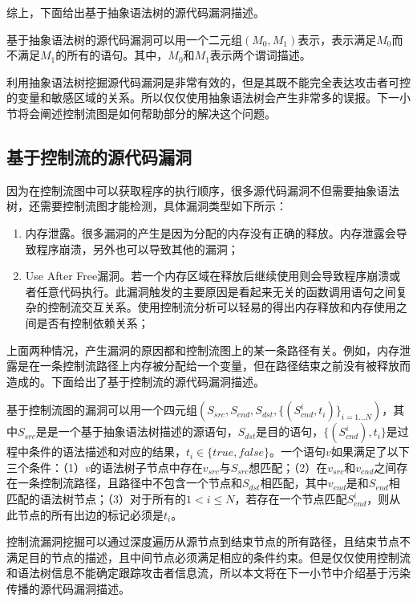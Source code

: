 综上，下面给出基于抽象语法树的源代码漏洞描述。

\begin{definition}
\label{基于抽象语法树的源代码漏洞描述}
基于抽象语法树的源代码漏洞可以用一个二元组$(M_0,M_1)$表示，表示满足$M_0$而不满足$M_1$的所有的语句。其中，$M_0$和$M_1$表示两个谓词描述。
\end{definition}

利用抽象语法树挖掘源代码漏洞是非常有效的，但是其既不能完全表达攻击者可控的变量和敏感区域的关系。所以仅仅使用抽象语法树会产生非常多的误报。下一小节将会阐述控制流图是如何帮助部分的解决这个问题。

\subsection{基于控制流的源代码漏洞}

因为在控制流图中可以获取程序的执行顺序，很多源代码漏洞不但需要抽象语法树，还需要控制流图才能检测，具体漏洞类型如下所示：

\begin{enumerate}[(1)]
\item 内存泄露。很多漏洞的产生是因为分配的内存没有正确的释放。内存泄露会导致程序崩溃，另外也可以导致其他的漏洞；
\item Use After Free漏洞。若一个内存区域在释放后继续使用则会导致程序崩溃或者任意代码执行。此漏洞触发的主要原因是看起来无关的函数调用语句之间复杂的控制流交互关系。使用控制流分析可以轻易的得出内存释放和内存使用之间是否有控制依赖关系；
\end{enumerate}
上面两种情况，产生漏洞的原因都和控制流图上的某一条路径有关。例如，内存泄露是在一条控制流路径上内存被分配给一个变量，但在路径结束之前没有被释放而造成的。下面给出了基于控制流的源代码漏洞描述。

\begin{definition}
基于控制流图的漏洞可以用一个四元组$(S_{src},S_{end},S_{dst},\{(S^{i}_{cnd},t_i)\}_{i=1...N})$，其中$S_{src}$是是一个基于抽象语法树描述的源语句，$S_{dst}$是目的语句，$\{(S^{i}_{cnd}),t_i\}$是过程中条件的语法描述和对应的结果，$t_i \in \{true, false\}$。一个语句$v$如果满足了以下三个条件：（1）$v$的语法树子节点中存在$v_{src}$与$S_{src}$想匹配；（2）在$v_{src}$和$v_{end}$之间存在一条控制流路径，且路径中不包含一个节点和$S_{dst}$相匹配，其中$v_{end}$是和$S_{end}$相匹配的语法树节点；（3）对于所有的$1< i \leq N$，若存在一个节点匹配$S^{i}_{end}$，则从此节点的所有出边的标记必须是$t_i$。
\end{definition}

控制流漏洞挖掘可以通过深度遍历从源节点到结束节点的所有路径，且结束节点不满足目的节点的描述，且中间节点必须满足相应的条件约束。但是仅仅使用控制流和语法树信息不能确定跟踪攻击者信息流，所以本文将在下一小节中介绍基于污染传播的源代码漏洞描述。


